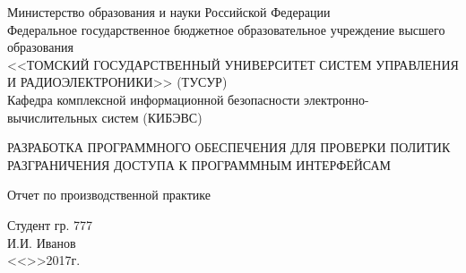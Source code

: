 \begin{titlepage}

\begin{center}
 Министерство образования и науки Российской Федерации\\
 Федеральное государственное бюджетное образовательное учреждение высшего образования\\
 <<ТОМСКИЙ ГОСУДАРСТВЕННЫЙ УНИВЕРСИТЕТ СИСТЕМ УПРАВЛЕНИЯ И РАДИОЭЛЕКТРОНИКИ>> (ТУСУР)\\
 Кафедра комплексной информационной безопасности электронно-вычислительных систем (КИБЭВС)\\
\end{center}

\vfill

\begin{center}
\MakeTextUppercase{Разработка программного обеспечения для проверки политик разграничения доступа к программным интерфейсам}

Отчет по производственной практике
\end{center}

\vfill

\begin{minipage}{0.45\textwidth}
    \begin{flushleft}
     \phantom{aaaaaaaaaaaaaaaaa}
    \end{flushleft}
\end{minipage}%
\begin{minipage}{0.45\textwidth}
 \begin{flushleft}
  Студент гр. 777 \\
  \underline{\hspace{3cm}}И.И. Иванов \\
  <<\underline{\hspace{1cm}}>>\underline{\hspace{3cm}}2017г.\\
 \end{flushleft}
\end{minipage}

\vfill


\end{titlepage}
